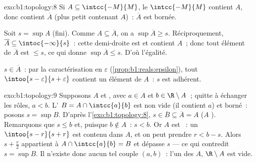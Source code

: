 \begin{solution}{exo:b1:topology:8}
Si $A \subseteq \intcc{-M}{M}$, le  $\intcc{-M}{M}$ contient $A$,
donc contient $\overline A$ (plus petit  contenant $A$)~:
$\overline A$ est bornée.

Soit $s = \sup A$ (fini). Comme $A \subseteq \overline A$, on a $\sup
\overline A \geq s$. Réciproquement, $\overline A \subseteq
\intoc{-\infty}{s}$~: cette demi-droite est  et contient $A$~;
donc tout élément de $\overline A$ est $\leq s$, ce qui donne
$\sup\overline A \leq s$. D'où l'égalité.

$s \in \overline A$~: par la caractérisation en $\varepsilon$
(\cref{prop:b1:reals:epsilon}), tout  $\intoo{s -
\varepsilon}{s + \varepsilon}$ contient un élément de $A$~: $s$ est
adhérent.
\end{solution}

\begin{solution}{exo:b1:topology:9}
Supposons $A$  et , avec $a \in A$ et $b \in \R
\setminus A$~; quitte à échanger les rôles, $a < b$. L' $B = A
\cap \intcc{a}{b}$ est non vide (il contient $a$) et borné~: posons
$s = \sup B$. D'après l'\cref{exo:b1:topology:8}, $s \in \overline B
\subseteq \overline A = A$ ($A$ ). Remarquons que $s \leq b$ et,
puisque $b \notin A$~: $s < b$. Or $A$ est ~: un 
$\intoo{s - r}{s + r}$ est contenu dans $A$, et on peut prendre
$r < b - s$. Alors $s + \frac{r}{2}$ appartient à $A \cap
\intcc{a}{b} = B$ et dépasse $s$ --- ce qui contredit $s = \sup B$. Il
n'existe donc aucun tel couple $(a, b)$~: l'un des  $A$,
$\R \setminus A$ est vide.
\end{solution}

